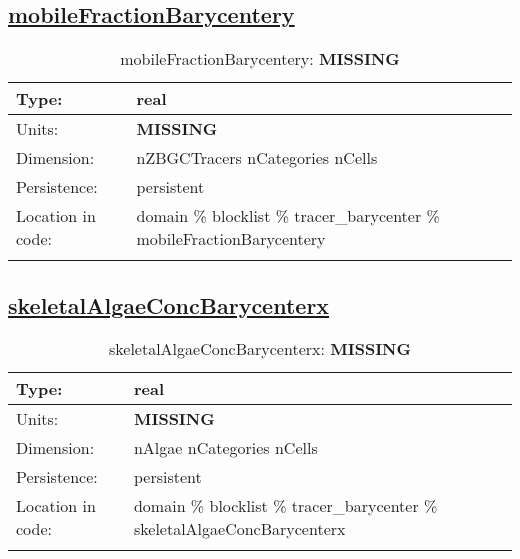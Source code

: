 \subsection[mobileFractionBarycentery]{\hyperref[sec:var_tab_tracer_barycenter]{mobileFractionBarycentery}}
\label{subsec:var_sec_tracer_barycenter_mobileFractionBarycentery}
\begin{center}
\begin{longtable}{| p{2.0in} | p{4.0in} |}
        \hline 
        Type: & real \\
        \hline 
        Units: & {\bf \color{red} MISSING} \\
        \hline 
        Dimension: & nZBGCTracers nCategories nCells \\
        \hline 
        Persistence: & persistent \\
        \hline 
         Location in code: & domain \% blocklist \% tracer\_barycenter \% mobileFractionBarycentery \\
         \hline 
    \caption{mobileFractionBarycentery: {\bf \color{red} MISSING}}
\end{longtable}
\end{center}
\subsection[skeletalAlgaeConcBarycenterx]{\hyperref[sec:var_tab_tracer_barycenter]{skeletalAlgaeConcBarycenterx}}
\label{subsec:var_sec_tracer_barycenter_skeletalAlgaeConcBarycenterx}
\begin{center}
\begin{longtable}{| p{2.0in} | p{4.0in} |}
        \hline 
        Type: & real \\
        \hline 
        Units: & {\bf \color{red} MISSING} \\
        \hline 
        Dimension: & nAlgae nCategories nCells \\
        \hline 
        Persistence: & persistent \\
        \hline 
         Location in code: & domain \% blocklist \% tracer\_barycenter \% skeletalAlgaeConcBarycenterx \\
         \hline 
    \caption{skeletalAlgaeConcBarycenterx: {\bf \color{red} MISSING}}
\end{longtable}
\end{center}
